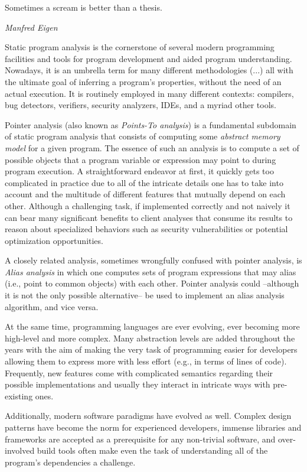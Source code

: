 \label{chapter:intro}

\epigraph{Sometimes a scream is better than a thesis.}{\textit{Manfred Eigen}}

Static program analysis is the cornerstone of several modern programming facilities and tools for program development and aided program understanding. Nowadays, it is an umbrella term for many different methodologies (...) all with the ultimate goal of inferring a program's properties, without the need of an actual execution. It is routinely employed in many different contexts: compilers, bug detectors, verifiers, security analyzers, IDEs, and a myriad other tools.

Pointer analysis (also known as \emph{Points-To analysis}) is a fundamental subdomain of static program analysis that consists of computing some \emph{abstract memory model} for a given program. The essence of such an analysis is to compute a set of possible objects that a program variable or expression may point to during program execution. A straightforward endeavor at first, it quickly gets too complicated in practice due to all of the intricate details one has to take into account and the multitude of different features that mutually depend on each other. Although a challenging task, if implemented correctly and not naively it can bear many significant benefits to client analyses that consume its results to reason about specialized behaviors such as security vulnerabilities or potential optimization opportunities.

A closely related analysis, sometimes wrongfully confused with pointer analysis, is \emph{Alias analysis} in which one computes sets of program expressions that may alias (i.e., point to common objects) with each other. Pointer analysis could --although it is not the only possible alternative-- be used to implement an alias analysis algorithm, and vice versa.

At the same time, programming languages are ever evolving, ever becoming more high-level and more complex. Many abstraction levels are added throughout the years with the aim of making the very task of programming easier for developers allowing them to express more with less effort (e.g., in terms of lines of code). Frequently, new features come with complicated semantics regarding their possible implementations and usually they interact in intricate ways with pre-existing ones.

Additionally, modern software paradigms have evolved as well. Complex design patterns have become the norm for experienced developers, immense libraries and frameworks are accepted as a prerequisite for any non-trivial software, and over-involved build tools often make even the task of understanding all of the program's dependencies a challenge.

